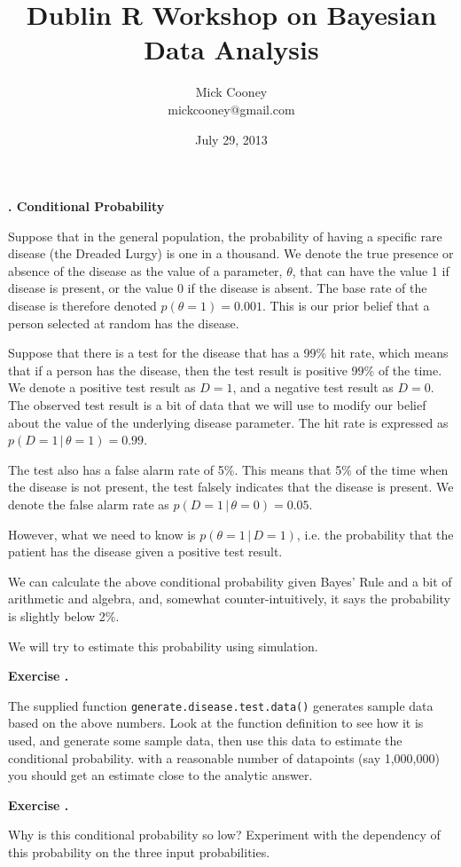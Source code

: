 \documentclass[10pt, a4paper]{article}
\title{Dublin R Workshop on Bayesian Data Analysis}
\author{Mick Cooney\\mickcooney@gmail.com}
\date{July 29, 2013}
\newcounter{wssection}
\newcounter{wsexercise}[wssection]
\newcommand{\worksheetsection}[1]{
\vspace{10mm}
\stepcounter{wssection}
\noindent \Large \textbf{\thewssection. #1} \normalsize
\vspace{3mm}
}
\newcommand{\worksheetexercise}{
\stepcounter{wsexercise}
\vspace{5mm} \noindent \textbf{Exercise \thewssection.\thewsexercise \;}
}
\begin{document}
\maketitle


\worksheetsection{Conditional Probability}

\noindent
Suppose that in the general population, the probability of having a
specific rare disease (the Dreaded Lurgy) is one in a thousand. We
denote the true presence or absence of the disease as the value of a
parameter, $\theta$, that can have the value 1 if disease is present,
or the value 0 if the disease is absent. The base rate of the disease
is therefore denoted $p(\theta = 1) = 0.001$. This is our prior belief
that a person selected at random has the disease.

Suppose that there is a test for the disease that has a 99\% hit rate,
which means that if a person has the disease, then the test result is
positive 99\% of the time. We denote a positive test result as $D = 1$,
and a negative test result as $D = 0$. The observed test result is
a bit of data that we will use to modify our belief about the value of
the underlying disease parameter. The hit rate is expressed as
$p(D = 1 \, | \, \theta = 1) = 0.99$.

The test also has a false alarm rate of 5\%. This means that 5\% of
the time when the disease is not present, the test falsely indicates
that the disease is present. We denote the false alarm rate as
$p(D = 1 \, | \, \theta = 0) = 0.05$.

However, what we need to know is $p(\theta = 1 \, | \, D = 1)$, i.e. the
probability that the patient has the disease given a positive test
result.

We can calculate the above conditional probability given Bayes' Rule
and a bit of arithmetic and algebra, and, somewhat
counter-intuitively, it says the probability is slightly below 2\%.

We will try to estimate this probability using simulation.

\worksheetexercise
The supplied function \texttt{generate.disease.test.data()} generates
sample data based on the above numbers. Look at the function
definition to see how it is used, and generate some sample data, then
use this data to estimate the conditional probability. with a
reasonable number of datapoints (say 1,000,000) you should get an
estimate close to the analytic answer.


\worksheetexercise
Why is this conditional probability so low? Experiment with the
dependency of this probability on the three input probabilities.
\end{document}
